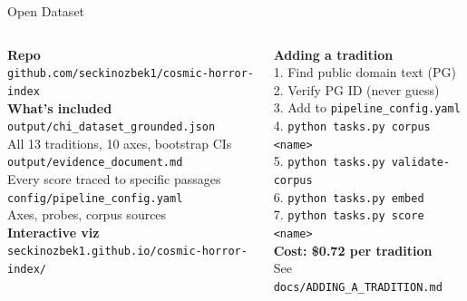 \documentclass[10pt, aspectratio=169]{beamer}
\begin{document}
\begin{frame}{Open Dataset}
  \begin{columns}[T]
      \textbf{Repo}\\
      \small\texttt{github.com/seckinozbek1/cosmic-horror-index}\\[0.8em]
      \textbf{What's included}\\[0.3em]
      \small
      \texttt{output/chi\_dataset\_grounded.json}\\
      \quad All 13 traditions, 10 axes, bootstrap CIs\\[0.3em]
      \texttt{output/evidence\_document.md}\\
      \quad Every score traced to specific passages\\[0.3em]
      \texttt{config/pipeline\_config.yaml}\\
      \quad Axes, probes, corpus sources\\[0.8em]
      \textbf{Interactive viz}\\
      \small\texttt{seckinozbek1.github.io/cosmic-horror-index/}

      \textbf{Adding a tradition}\\[0.4em]
      \small
      1. Find public domain text (PG)\\
      2. Verify PG ID (never guess)\\
      3. Add to \texttt{pipeline\_config.yaml}\\
      4. \texttt{python tasks.py corpus <name>}\\
      5. \texttt{python tasks.py validate-corpus}\\
      6. \texttt{python tasks.py embed}\\
      7. \texttt{python tasks.py score <name>}\\[0.8em]
      \textbf{Cost: \$0.72 per tradition}\\
      \small See \texttt{docs/ADDING\_A\_TRADITION.md}
  \end{columns}
\end{frame}
\end{document}
